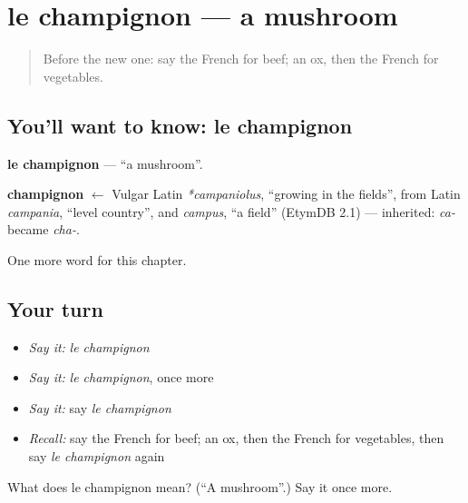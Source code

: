 \section[le champignon]{le champignon — a mushroom}

\label{lesson:FR-C119-champignon}



\begin{quote}
Before the new one: say the French for beef; an ox, then the French for vegetables.
\end{quote}

\subsection*{You'll want to know: le champignon}
\textbf{le champignon} — \textquotedblleft{}a mushroom\textquotedblright{}.

\begin{cousinweb}
\textbf{champignon} $\leftarrow$ Vulgar Latin \emph{*campaniolus}, \textquotedblleft{}growing in the fields\textquotedblright{}, from Latin \emph{campania}, \textquotedblleft{}level country\textquotedblright{}, and \emph{campus}, \textquotedblleft{}a field\textquotedblright{} (EtymDB 2.1) — inherited: \emph{ca-} became \emph{cha-}.
\end{cousinweb}

\begin{grammarlens}[title={What you've built}]
One more word for this chapter.
\end{grammarlens}

\subsection*{Your turn}
\begin{itemize}
\raggedright
  \item \emph{Say it:} \emph{le champignon}
  \item \emph{Say it:} \emph{le champignon}, once more
  \item \emph{Say it:} say \emph{le champignon}
  \item \emph{Recall:} say the French for beef; an ox, then the French for vegetables, then say \emph{le champignon} again
\end{itemize}

\begin{tcolorbox}[breakable,colback=teal!4,colframe=teal!35!black,title={Before you move on}]
What does le champignon mean? (\textquotedblleft{}A mushroom\textquotedblright{}.) Say it once more.
\end{tcolorbox}
